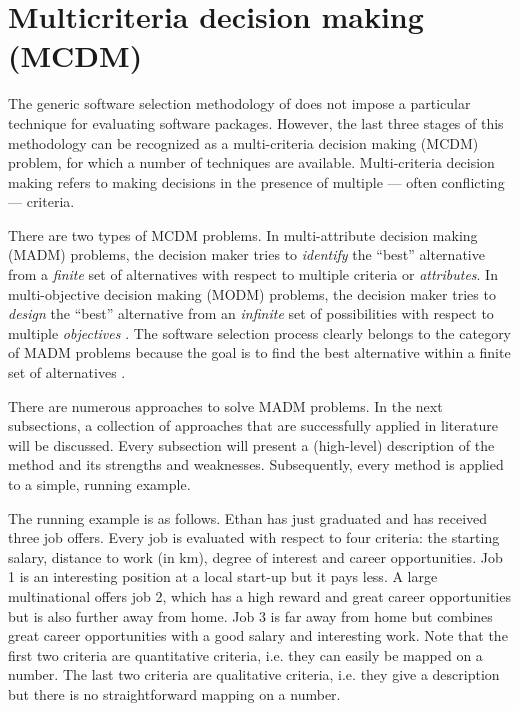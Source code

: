 \section{Multicriteria decision making (MCDM)}
\label{sec:mcdm}

The generic software selection methodology of \citet{Jadhav:2011} does not impose a particular technique for evaluating software packages. However, the last three stages of this methodology can be recognized as a multi-criteria decision making (MCDM) problem, for which a number of techniques are available. Multi-criteria decision making refers to making decisions in the presence of multiple --- often conflicting --- criteria. 

There are two types of MCDM problems. In multi-attribute decision making (MADM) problems, the decision maker tries to \emph{identify} the ``best'' alternative from a \emph{finite} set of alternatives with respect to multiple criteria or \emph{attributes}. In multi-objective decision making (MODM) problems, the decision maker tries to \emph{design} the ``best'' alternative from an \emph{infinite} set of possibilities with respect to multiple \emph{objectives} \cite{Kahraman:2008}. The software selection process clearly belongs to the category of MADM problems because the goal is to find the best alternative within a finite set of alternatives \cite{Jadhav:2009, Jadhav:2011}. 

There are numerous approaches to solve MADM problems. In the next subsections, a collection of approaches that are successfully applied in literature will be discussed. Every subsection will present a (high-level) description of the method and its strengths and weaknesses. Subsequently, every method is applied to a simple, running example.

The running example is as follows. Ethan has just graduated and has received three job offers. Every job is evaluated with respect to four criteria: the starting salary, distance to work (in km), degree of interest and career opportunities. Job 1 is an interesting position at a local start-up but it pays less. A large multinational offers job 2, which has a high reward and great career opportunities but is also further away from home. Job 3 is far away from home but combines great career opportunities with a good salary and interesting work. Note that the first two criteria are quantitative criteria, i.e. they can easily be mapped on a number. The last two criteria are qualitative criteria, i.e. they give a description but there is no straightforward mapping on a number. 

